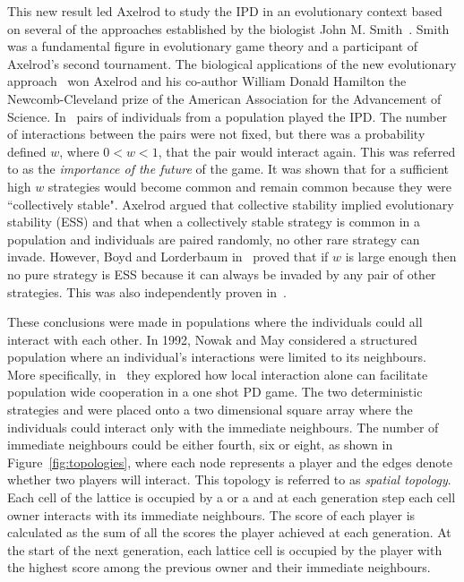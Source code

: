 This new result led Axelrod to
study the IPD in an evolutionary context based on several of the approaches
established by the biologist John M. Smith~\cite{Smith1974,
Smith1979, Smith1973}. Smith was a fundamental figure in evolutionary game theory and a
participant of Axelrod's second tournament. The biological applications of the
new evolutionary approach~\cite{Axelrod1981} won Axelrod and his co-author William
Donald Hamilton the Newcomb-Cleveland prize of the American Association for the
Advancement of Science. In~\cite{Axelrod1981} pairs of individuals from a
population played the IPD. The number of interactions between the pairs were not
fixed, but there was a probability defined \(w\), where \(0 < w < 1\), that the
pair would interact again. This was referred to as the \textit{importance of the
future} of the game. It was shown that for a sufficient high \(w\) \TitForTat
strategies
would become common and remain common because they were ``collectively stable".
Axelrod argued that collective stability implied evolutionary stability (ESS)
and that when a collectively stable strategy is common in a population and
individuals are paired randomly, no other rare strategy can invade. However,
Boyd and Lorderbaum in~\cite{Boyd1987} proved that if \(w\)
is large enough then no pure strategy is ESS because it can
always be invaded by any pair of other strategies. This was also independently
proven in~\cite{Pudaite1987}.

These conclusions were made in populations where the individuals could all
interact with each other. In 1992, Nowak and May considered a structured population
where an individual's interactions were limited to its neighbours.
More specifically, in~\cite{Nowak1992b} they explored how local interaction
alone can facilitate population wide cooperation in a one shot PD game. The two
deterministic strategies \Defector and \Cooperator were placed onto a two
dimensional square array where the individuals could interact only with the
immediate neighbours. The number of immediate neighbours could be either
fourth, six or eight, as shown in Figure~\ref{fig:topologies}, where each node
represents a player and the edges denote whether two players will interact. This
topology is referred to as \textit{spatial topology}. Each cell of the lattice is
occupied by a \Cooperator or a \Defector and at each generation step each cell owner
interacts with its immediate neighbours. The score of each player is calculated
as the sum of all the scores the player achieved at each generation. At the
start of the next generation, each lattice cell is occupied by the player with
the highest score among the previous owner and their immediate neighbours.

